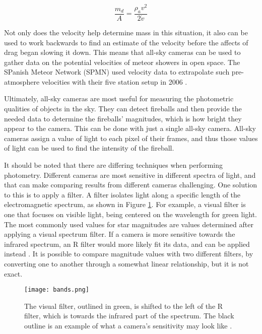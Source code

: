\begin{equation} \label{eq:mass}
	\frac{m_d}{A} = \frac{\rho_a v^2}{2 \dot v}
\end{equation}

Not only does the velocity help determine mass in this situation, it also can be used to work backwards to find an estimate of the velocity before the affects of drag began slowing it down. This means that all-sky cameras can be used to gather data on the potential velocities of meteor showers in open space. The SPanish Meteor Network (SPMN) used velocity data to extrapolate such pre-atmosphere velocities with their five station setup in 2006 \cite{Trigo-Rodriguez2007}. 

Ultimately, all-sky cameras are most useful for measuring the photometric qualities of objects in the sky. They can detect fireballs and then provide the needed data to determine the fireballs' magnitudes, which is how bright they appear to the camera. This can be done with just a single all-sky camera. All-sky cameras assign a value of light to each pixel of their frames, and thus those values of light can be used to find the intensity of the fireball.

It should be noted that there are differing techniques when performing photometry. Different cameras are most sensitive in different spectra of light, and that can make comparing results from different cameras challenging. One solution to this is to apply a filter. A filter isolates light along a specific length of the electromagnetic spectrum, as shown in Figure \ref{fig:bands}. For example, a visual filter is one that focuses on visible light, being centered on the wavelength for green light. The most commonly used values for star magnitudes are values determined after applying a visual spectrum filter. If a camera is more sensitive towards the infrared spectrum, an R filter would more likely fit its data, and can be applied instead \cite{Suggs2014}. It is possible to compare magnitude values with two different filters, by converting one to another through a somewhat linear relationship, but it is not exact.

\begin{figure}[ht!]
	\centering
	\texttt{[image: bands.png]}
	\caption{The visual filter, outlined in green, is shifted to the left of the R filter, which is towards the infrared part of the spectrum. The black outline is an example of what a camera's sensitivity may look like \protect\cite{Suggs2017}.}
	\label{fig:bands}
\end{figure}


